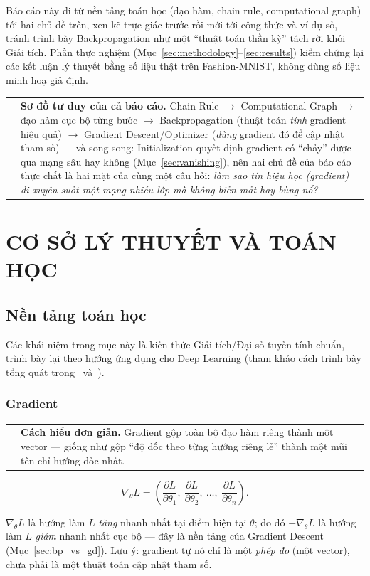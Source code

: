 \documentclass[12pt,a4paper]{report}
\makeatletter
\newenvironment{tructiep}[1][Cách hiểu đơn giản]
  {\par\smallskip\noindent\begin{tabular}{@{}p{0.35em}@{\hspace{6pt}}p{\dimexpr\linewidth-1.9em\relax}@{}}
   \textcolor{boxln}{\rule{2pt}{\baselineskip}} & \textbf{#1.}\enspace\ignorespaces}
  {\end{tabular}\par\smallskip}
\makeatother
\begin{document}
Báo cáo này đi từ nền tảng toán học (đạo hàm, chain rule, computational
graph) tới hai chủ đề trên, xen kẽ trực giác trước rồi mới tới công thức và
ví dụ số, tránh trình bày Backpropagation như một ``thuật toán thần kỳ''
tách rời khỏi Giải tích. Phần thực nghiệm (Mục~\ref{sec:methodology}--\ref{sec:results})
kiểm chứng lại các kết luận lý thuyết bằng số liệu thật trên Fashion-MNIST,
không dùng số liệu minh hoạ giả định.

\begin{tructiep}[Sơ đồ tư duy của cả báo cáo]
Chain Rule $\to$ Computational Graph $\to$ đạo hàm cục bộ từng bước $\to$
Backpropagation (thuật toán \emph{tính} gradient hiệu quả) $\to$ Gradient
Descent/Optimizer (\emph{dùng} gradient đó để cập nhật tham số) --- và song
song: Initialization quyết định gradient có ``chảy'' được qua mạng sâu hay
không (Mục~\ref{sec:vanishing}), nên hai chủ đề của báo cáo thực chất là
hai mặt của cùng một câu hỏi: \emph{làm sao tín hiệu học (gradient) đi
xuyên suốt một mạng nhiều lớp mà không biến mất hay bùng nổ?}
\end{tructiep}

\chapter{CƠ SỞ LÝ THUYẾT VÀ TOÁN HỌC}
\section{Nền tảng toán học}

Các khái niệm trong mục này là kiến thức Giải tích/Đại số tuyến tính chuẩn,
trình bày lại theo hướng ứng dụng cho Deep Learning (tham khảo cách trình
bày tổng quát trong~\citet{bishop2006pattern} và~\citet{goodfellow2016deep}).

\subsection{Gradient}

\begin{tructiep}
Gradient gộp toàn bộ đạo hàm riêng thành một vector --- giống như gộp ``độ
dốc theo từng hướng riêng lẻ'' thành một mũi tên chỉ hướng dốc nhất.
\end{tructiep}

$$\nabla_\theta L = \left(\frac{\partial L}{\partial\theta_1},\ \frac{\partial L}{\partial\theta_2},\ \ldots,\ \frac{\partial L}{\partial\theta_n}\right).$$

$\nabla_\theta L$ là hướng làm $L$ \emph{tăng} nhanh nhất tại điểm hiện tại
$\theta$; do đó $-\nabla_\theta L$ là hướng làm $L$ \emph{giảm} nhanh nhất
cục bộ --- đây là nền tảng của Gradient Descent (Mục~\ref{sec:bp_vs_gd}).
Lưu ý: gradient tự nó chỉ là một \emph{phép đo} (một vector), chưa phải là
một thuật toán cập nhật tham số.
\end{document}
